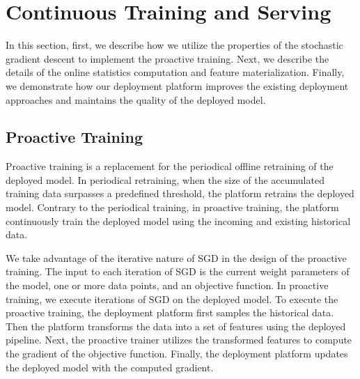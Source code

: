 \section{Continuous Training and Serving} \label{continuous-training-serving}
In this section, first, we describe how we utilize the properties of the stochastic gradient descent to implement the proactive training.
Next, we describe the details of the online statistics computation and feature materialization.
Finally, we demonstrate how our deployment platform improves the existing deployment approaches and maintains the quality of the deployed model.

\subsection{Proactive Training} \label{proactive-training}
Proactive training is a replacement for the periodical offline retraining of the deployed model.
In periodical retraining, when the size of the accumulated training data surpasses a predefined threshold, the platform retrains the deployed model.
Contrary to the periodical training, in proactive training, the platform continuously train the deployed model using the incoming and existing historical data.

We take advantage of the iterative nature of SGD in the design of the proactive training.
The input to each iteration of SGD is the current weight parameters of the model, one or more data points, and an objective function.
In proactive training, we execute iterations of SGD on the deployed model.
To execute the proactive training, the deployment platform first samples the historical data.
Then the platform transforms the data into a set of features using the deployed pipeline.
Next, the proactive trainer utilizes the transformed features to compute the gradient of the objective function.
Finally, the deployment platform updates the deployed model with the computed gradient.

